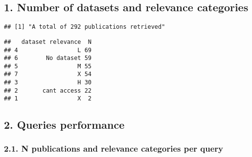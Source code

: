 \documentclass[
]{article}
\newenvironment{Shaded}{\begin{snugshade}}{\end{snugshade}}
\newcommand{\FunctionTok}[1]{\textcolor[rgb]{0.00,0.00,0.00}{#1}}
\newcommand{\NormalTok}[1]{#1}
\newcommand{\OtherTok}[1]{\textcolor[rgb]{0.56,0.35,0.01}{#1}}
\newcommand{\SpecialCharTok}[1]{\textcolor[rgb]{0.00,0.00,0.00}{#1}}
\newcommand{\StringTok}[1]{\textcolor[rgb]{0.31,0.60,0.02}{#1}}
\begin{document}
\hypertarget{number-of-datasets-and-relevance-categories}{%
\subsection{1. Number of datasets and relevance
categories}\label{number-of-datasets-and-relevance-categories}}

\begin{Shaded}
\end{Shaded}

\begin{verbatim}
## [1] "A total of 292 publications retrieved"
\end{verbatim}

\begin{Shaded}
\end{Shaded}

\begin{verbatim}
##   dataset relevance  N
## 4                 L 69
## 6        No dataset 59
## 5                 M 55
## 7                 X 54
## 3                 H 30
## 2       cant access 22
## 1                 X  2
\end{verbatim}

\hypertarget{queries-performance}{%
\subsection{2. Queries performance}\label{queries-performance}}

\hypertarget{n-publications-and-relevance-categories-per-query}{%
\subsubsection{2.1. N publications and relevance categories per
query}\label{n-publications-and-relevance-categories-per-query}}
\end{document}
